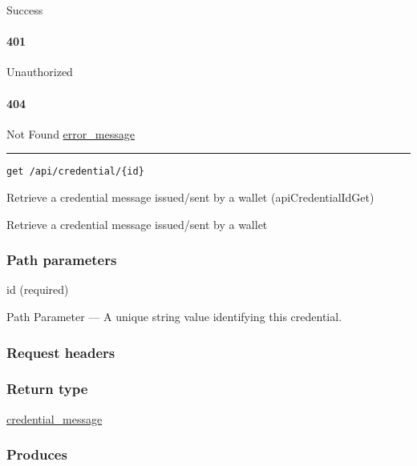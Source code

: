 Success

\hypertarget{section-94}{%
\paragraph{401}\label{section-94}}

Unauthorized \protect\hyperlink{}{}

\hypertarget{section-95}{%
\paragraph{404}\label{section-95}}

Not Found \protect\hyperlink{error_message}{error\_message}

\begin{center}\rule{0.5\linewidth}{\linethickness}\end{center}

\protect\hypertarget{apiCredentialIdGet}{}{}

\begin{verbatim}
get /api/credential/{id}
\end{verbatim}

Retrieve a credential message issued/sent by a wallet
({apiCredentialIdGet})

Retrieve a credential message issued/sent by a wallet

\hypertarget{path-parameters-16}{%
\subsubsection{Path parameters}\label{path-parameters-16}}

id (required)

{Path Parameter} --- A unique string value identifying this credential.

\hypertarget{request-headers-13}{%
\subsubsection{Request headers}\label{request-headers-13}}

\hypertarget{return-type-23}{%
\subsubsection{Return type}\label{return-type-23}}

\protect\hyperlink{credential_message}{credential\_message}

\hypertarget{produces-29}{%
\subsubsection{Produces}\label{produces-29}}

